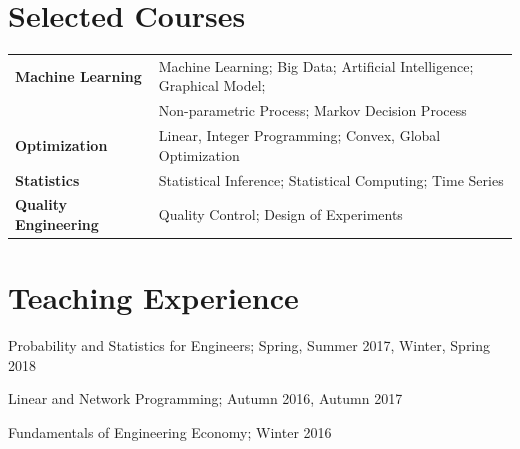 \documentclass[margin,line]{resume}
\begin{document}
\begin{resume}
        \section{\mysidestyle Selected Courses}
\vspace{0.5em}
	\begin{tabular}{ll }
          \textbf{Machine Learning} & Machine Learning; Big Data; Artificial Intelligence; Graphical Model; \\
                           &  Non-parametric Process; Markov Decision Process\\
  \textbf{Optimization} & Linear, Integer Programming; Convex,  Global Optimization \\
   \textbf{Statistics}& Statistical Inference; Statistical Computing; Time Series \\
\textbf{Quality Engineering} & Quality Control; Design of Experiments \\
	\end{tabular}

 



\section{\mysidestyle Teaching Experience}
        \begin{list2}
        \item   Probability and Statistics for Engineers; Spring, Summer 2017, Winter, Spring 2018 
        \item   Linear and Network Programming; Autumn 2016, Autumn 2017
        \item  Fundamentals of Engineering Economy; Winter 2016
        \end{list2}




\end{resume}
\end{document}
